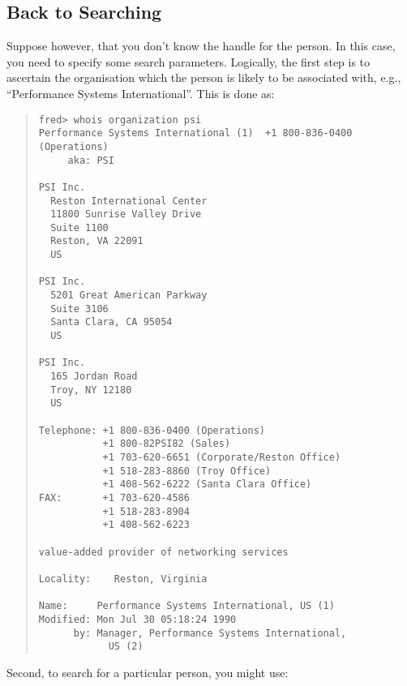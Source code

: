 \subsection	{Back to Searching}
Suppose however,
that you don't know the handle for the person.
In this case,
you need to specify some search parameters.
Logically,
the first step is to ascertain the organisation which the person is likely to
be associated with, e.g.,
``Performance Systems International''.
This is done as:
\begin{quote}\footnotesize\begin{verbatim}
fred> whois organization psi
Performance Systems International (1)  +1 800-836-0400 (Operations)
     aka: PSI

PSI Inc.
  Reston International Center
  11800 Sunrise Valley Drive
  Suite 1100
  Reston, VA 22091
  US

PSI Inc.
  5201 Great American Parkway
  Suite 3106
  Santa Clara, CA 95054
  US

PSI Inc.
  165 Jordan Road
  Troy, NY 12180
  US

Telephone: +1 800-836-0400 (Operations)
           +1 800-82PSI82 (Sales)
           +1 703-620-6651 (Corporate/Reston Office)
           +1 518-283-8860 (Troy Office)
           +1 408-562-6222 (Santa Clara Office)
FAX:       +1 703-620-4586
           +1 518-283-8904
           +1 408-562-6223

value-added provider of networking services

Locality:    Reston, Virginia

Name:     Performance Systems International, US (1)
Modified: Mon Jul 30 05:18:24 1990
      by: Manager, Performance Systems International,
            US (2)
\end{verbatim}\end{quote}
Second,
to search for a particular person,
you might use:
